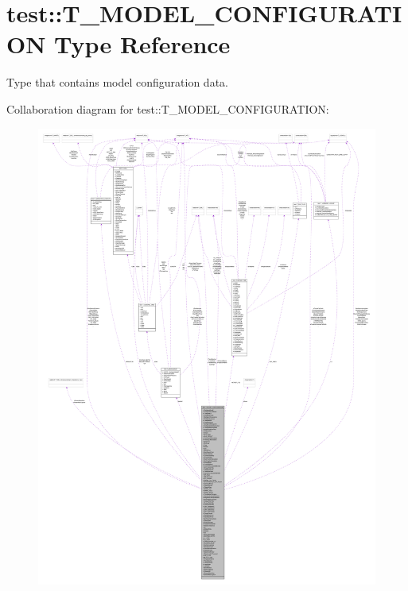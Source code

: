 \hypertarget{typetest_1_1_t___m_o_d_e_l___c_o_n_f_i_g_u_r_a_t_i_o_n}{
\section{test::T\_\-MODEL\_\-CONFIGURATION Type Reference}
\label{typetest_1_1_t___m_o_d_e_l___c_o_n_f_i_g_u_r_a_t_i_o_n}
}


Type that contains model configuration data.  




Collaboration diagram for test::T\_\-MODEL\_\-CONFIGURATION:\nopagebreak
\begin{figure}[H]
\begin{center}
\leavevmode
\includegraphics[width=400pt]{typetest_1_1_t___m_o_d_e_l___c_o_n_f_i_g_u_r_a_t_i_o_n__coll__graph}
\end{center}
\end{figure}
